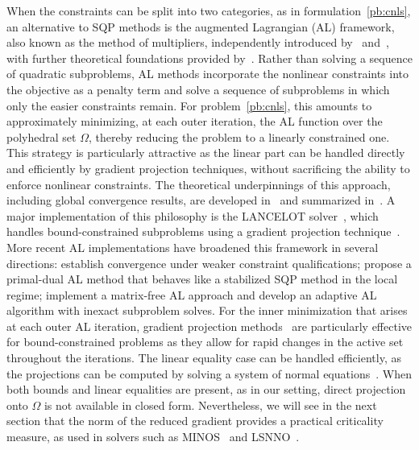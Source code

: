 When the constraints can be split into two categories, as in formulation~\eqref{pb:cnls}, an alternative to SQP methods is the augmented Lagrangian (AL) framework, also known as the method of multipliers, independently introduced by~\cite{hestenes:1969} and~\cite{powell:1969}, with further theoretical foundations provided by~\cite{rockafellar:1973}.
Rather than solving a sequence of quadratic subproblems, AL methods incorporate the nonlinear constraints into the objective as a penalty term and solve a sequence of subproblems in which only the easier constraints remain.
For problem~\eqref{pb:cnls}, this amounts to approximately minimizing, at each outer iteration, the AL function over the polyhedral set $\Omega$, thereby reducing the problem to a linearly constrained one. This strategy is particularly attractive as the linear part can be handled directly and efficiently by gradient projection techniques, without sacrificing the ability to enforce nonlinear constraints.
The theoretical underpinnings of this approach, including global convergence results, are developed in~\cite{conn-etal:1988a,conn-etal:1991, conn-etal:1993, conn-etal:1996b} and summarized	in~\cite[][Chapter~14]{conn-etal:2000}.
A major implementation of this philosophy is the LANCELOT solver~\cite{conn-etal:1992}, which handles bound-constrained
subproblems using a gradient projection technique~\cite{conn-etal:1988b}.
More recent AL implementations have broadened this framework in several	directions: \cite{andreani-etal:2008} establish convergence under
weaker constraint qualifications; \cite{gillrobinson:2012} propose a primal-dual AL method that behaves like a stabilized SQP method in the local regime; \cite{arreckx-etal:2016} implement a matrix-free AL approach and \cite{curtis-etal:2015} develop an adaptive AL algorithm with inexact subproblem solves.
For the inner minimization that arises at each outer AL iteration, gradient projection methods~\cite{moretoraldo:1991, linmore:1999a} are particularly effective for bound-constrained problems as they allow for rapid changes in the active set throughout the iterations. The linear equality case can be handled efficiently, as the projections can be computed by solving a system of normal equations~\cite{gould-etal:2001}.
When both bounds and linear equalities are present, as in our setting, direct projection onto $\Omega$ is not available in closed form. Nevertheless, we will see in the next section that the norm of the reduced gradient provides a practical criticality measure, as used in solvers such as MINOS~\cite{murtaghsaunders:1978} and LSNNO~\cite{tointtuyttens:1992}.

